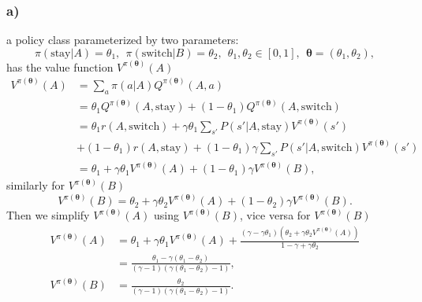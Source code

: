 \documentclass[12pt]{article}
\begin{document}
\subsubsection*{a)}
a policy class parameterized by two parameters:
\begin{equation*}
    \pi(\text{stay}|A) = \theta_1, ~~ \pi(\text{switch}|B) = \theta_2, ~~ \theta_1, \theta_2 \in [0,1], ~~ \mathbf{\boldsymbol\theta} = (\theta_1, \theta_2),
\end{equation*}
has the value function $V^{\pi(\boldsymbol\theta)}(A)$
\begin{equation*}
    \begin{split}
        V^{\pi(\boldsymbol\theta)}(A) &= \sum_a \pi(a|A)Q^{\pi(\boldsymbol{\theta})}(A,a)    \\
        &= \theta_1 Q^{\pi(\boldsymbol{\theta})}(A,\text{stay}) + (1-\theta_1)Q^{\pi(\boldsymbol{\theta})}(A,\text{switch})\\
        &= \theta_1r(A,\text{switch}) + \gamma\theta_1\sum_{s'}P(s'|A,\text{stay})V^{\pi(\boldsymbol\theta)}(s')\\ & + (1-\theta_1)r(A,\text{stay}) + (1-\theta_1)\gamma\sum_{s'}P(s'|A,\text{switch})V^{\pi(\boldsymbol\theta)}(s') \\
        &= \theta_1 + \gamma\theta_1V^{\pi(\boldsymbol\theta)}(A) + (1 - \theta_1)\gamma V^{\pi(\boldsymbol\theta)}(B),
    \end{split}
\end{equation*}
similarly for $V^{\pi(\boldsymbol\theta)}(B)$
\begin{equation*}
    V^{\pi(\boldsymbol\theta)}(B) = \theta_2 + \gamma\theta_2V^{\pi(\boldsymbol\theta)}(A) + (1-\theta_2)\gamma V^{\pi(\boldsymbol\theta)}(B).
\end{equation*}
Then we simplify $V^{\pi(\boldsymbol\theta)}(A)$ using $V^{\pi(\boldsymbol\theta)}(B)$, vice versa for $V^{\pi(\boldsymbol\theta)}(B)$
\begin{equation*}
    \begin{split}
        V^{\pi(\boldsymbol\theta)}(A) &= \theta_1 + \gamma\theta_1V^{\pi(\boldsymbol\theta)}(A) + \frac{(\gamma - \gamma\theta_1)(\theta_2 + \gamma\theta_2V^{\pi(\boldsymbol\theta)}(A))}{1-\gamma+\gamma\theta_2}     \\
        &= \frac{\theta_1 - \gamma(\theta_1 - \theta_2)}{(\gamma-1)(\gamma(\theta_1 - \theta_2)-1)}, \\
        V^{\pi(\boldsymbol\theta)}(B) &= \frac{\theta_2}{(\gamma-1)(\gamma(\theta_1 - \theta_2)-1)}.
    \end{split}
\end{equation*}
\end{document}
